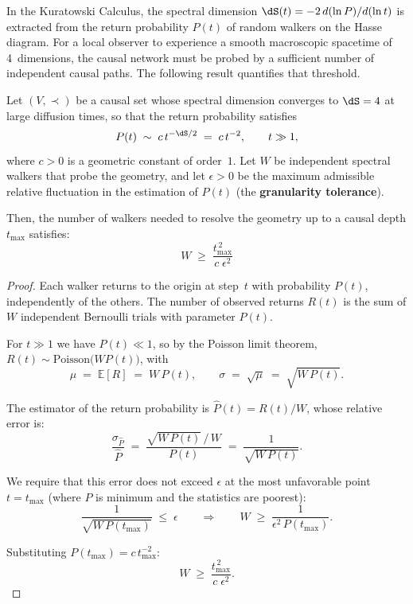 In the Kuratowski Calculus, the spectral dimension
$\dS(t) = -2\,d(\ln P)/d(\ln t)$ is extracted from the return
probability $P(t)$ of random walkers on the Hasse diagram. For a
local observer to experience a smooth macroscopic spacetime of
4~dimensions, the causal network must be probed by a sufficient
number of independent causal paths. The following result quantifies
that threshold.

\begin{theorem}
\label{thm:causal-resolution}
Let $(V, \prec)$ be a causal set whose spectral dimension converges to
$\dS = 4$ at large diffusion times, so that the return probability
satisfies
\[
  P(t) \;\sim\; c\,t^{-\dS/2} \;=\; c\,t^{-2},
  \qquad t \gg 1,
\]
where $c > 0$ is a geometric constant of order~$1$. Let $W$ be
independent spectral walkers that probe the geometry, and let
$\epsilon > 0$ be the maximum admissible relative fluctuation in the
estimation of $P(t)$ (the \textbf{granularity tolerance}).

Then, the number of walkers needed to resolve the geometry up to a
causal depth $t_{\max}$ satisfies:
\begin{equation}
  \boxed{\;W \;\geq\; \frac{t_{\max}^{\,2}}{c\;\epsilon^2}\;}
  \label{eq:causal-resolution}
\end{equation}
\end{theorem}

\begin{proof}
Each walker returns to the origin at step~$t$ with probability
$P(t)$, independently of the others. The number of observed returns
$R(t)$ is the sum of $W$ independent Bernoulli trials with parameter
$P(t)$.

For $t \gg 1$ we have $P(t) \ll 1$, so by the Poisson limit theorem,
$R(t) \sim \mathrm{Poisson}\bigl(W P(t)\bigr)$, with
\[
  \mu \;=\; \mathbb{E}[R] \;=\; W\,P(t),
  \qquad
  \sigma \;=\; \sqrt{\mu} \;=\; \sqrt{W\,P(t)}.
\]

The estimator of the return probability is
$\hat{P}(t) = R(t)/W$, whose relative error is:
\[
  \frac{\sigma_{\hat{P}}}{\hat{P}}
  \;=\; \frac{\sqrt{W\,P(t)}\,/\,W}{P(t)}
  \;=\; \frac{1}{\sqrt{W\,P(t)}}.
\]

We require that this error does not exceed $\epsilon$ at the most
unfavorable point $t = t_{\max}$ (where $P$ is minimum and the
statistics are poorest):
\[
  \frac{1}{\sqrt{W\,P(t_{\max})}} \;\leq\; \epsilon
  \qquad\Longrightarrow\qquad
  W \;\geq\; \frac{1}{\epsilon^2\,P(t_{\max})}.
\]

Substituting $P(t_{\max}) = c\,t_{\max}^{-2}$:
\[
  W \;\geq\; \frac{t_{\max}^{\,2}}{c\;\epsilon^2}.
\]
\end{proof}

